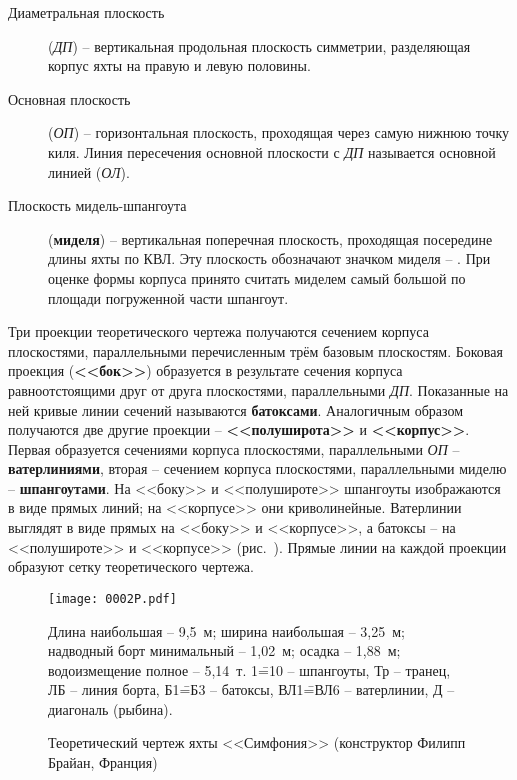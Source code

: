\begin{description}
\item [Диаметральная плоскость]
  (\textit{ДП}) \--- вертикальная продольная плоскость симметрии,
  разделяющая корпус яхты на правую и левую половины.
\item [Основная плоскость] (\textit{ОП})
  \--- горизонтальная плоскость, проходящая через самую нижнюю точку
  киля. Линия пересечения основной плоскости с \textit{ДП} называется
  основной линией (\textit{ОЛ}).
\item [Плоскость мидель-шпангоута]
  (\textbf{миделя}) \--- вертикальная поперечная
  плоскость, проходящая посередине длины яхты по КВЛ. Эту плоскость
  обозначают значком миделя \--- \midelsign. При оценке формы корпуса
  принято считать миделем самый большой по площади погруженной части
  шпангоут.
\end{description}

Три проекции теоретического чертежа получаются сечением корпуса
плоскостями, параллельными перечисленным трём базовым
плоскостям. Боковая проекция (\textbf{<<бок>>}) образуется в
результате сечения корпуса равноотстоящими друг от друга плоскостями,
параллельными \textit{ДП}. Показанные на ней кривые линии сечений
называются \textbf{батоксами}. Аналогичным образом получаются две
другие проекции \--- \textbf{<<полуширота>>} и
\textbf{<<корпус>>}. Первая образуется сечениями корпуса плоскостями,
параллельными \textit{ОП} \--- \textbf{ватерлиниями}, вторая \---
сечением корпуса плоскостями, параллельными миделю \---
\textbf{шпангоутами}. На <<боку>> и <<полушироте>> шпангоуты
изображаются в виде прямых линий; на <<корпусе>> они
криволинейные. Ватерлинии выглядят в виде прямых на <<боку>> и
<<корпусе>>, а батоксы \--- на <<полушироте>> и <<корпусе>>
(рис.~). Прямые линии на каждой проекции образуют сетку
теоретического чертежа.

\begin{figure*}[htb]
   \centering
   \texttt{[image: 0002P.pdf]}
   \caption{Теоретический чертеж яхты <<Симфония>> (конструктор Филипп Брайан, Франция)}
   \label{fig:2}
   \centering{}
   \small  
   Длина наибольшая \--- 9,5~м;
   ширина наибольшая \--- 3,25~м;
   надводный борт минимальный \--- 1,02~м;
   осадка \--- 1,88~м;
   водоизмещение полное \--- 5,14~т.
   1\==10 \--- шпангоуты,
   Тр \--- транец,
   ЛБ \--- линия борта,
   Б1\==Б3 \--- батоксы,
   ВЛ1\==ВЛ6 \--- ватерлинии,
   Д \--- диагональ (рыбина).
\end{figure*}

